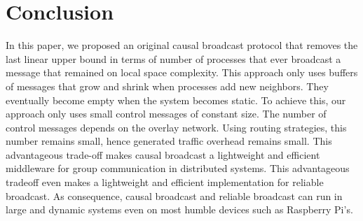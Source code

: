 
\section{Conclusion}
\label{sec:conclusion}


In this paper, we proposed an original causal broadcast protocol that removes
the last linear upper bound in terms of number of processes that ever broadcast
a message that remained on local space complexity. This approach only uses
buffers of messages that grow and shrink when processes add new neighbors. They
eventually become empty when the system becomes static. To achieve this, our
approach only uses small control messages of constant size. The number of
control messages depends on the overlay network. Using routing strategies, this
number remains small, hence generated traffic overhead remains small. This
advantageous trade-off makes causal broadcast a lightweight and efficient
middleware for group communication in distributed systems. This advantageous
tradeoff even makes \RPCBROADCAST a lightweight and efficient implementation
for reliable broadcast. As consequence, causal broadcast and reliable broadcast
can run in large and dynamic systems even on most humble devices such as
Raspberry Pi’s.




